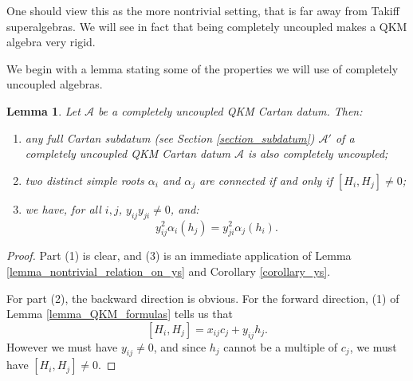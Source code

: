 \documentclass[12pt, a4paper, reqno]{amsart}
\def\AA{\mathcal{A}}
\newtheorem{lemma}{Lemma}
\theoremstyle{definition}
\theoremstyle{definition}
\theoremstyle{definition}
\numberwithin{theorem}{section}
\numberwithin{lemma}{section}
\numberwithin{remark}{section}
\numberwithin{definition}{section}
\numberwithin{corollary}{section}
\numberwithin{proposition}{section}
\numberwithin{example}{section}
\begin{document}
	One should view this as the more nontrivial setting, that is far away from Takiff superalgebras. We will see in fact that being completely uncoupled makes a QKM algebra very rigid.
	
	We begin with a lemma stating some of the properties we will use of completely uncoupled algebras.
	\begin{lemma}\label{lemma_uncoupled_facts}
		Let $\AA$ be a completely uncoupled QKM Cartan datum.  Then:
		\begin{enumerate}
			\item any full Cartan subdatum (see Section \ref{section_subdatum}) $\AA'$ of a completely uncoupled QKM Cartan datum $\AA$ is also completely uncoupled;
			\item two distinct simple roots $\alpha_i$ and $\alpha_j$  are connected if and only if $[H_i,H_j]\neq0$;
			\item we have, for all $i,j$, $y_{ij}y_{ji}\neq0$, and:
			\[
			y_{ij}^2\alpha_i(h_j)=y_{ji}^2\alpha_j(h_i).
			\]
		\end{enumerate} 
	\end{lemma}
	\begin{proof}
		Part (1) is clear, and (3) is an immediate application of Lemma \ref{lemma_nontrivial_relation_on_ys} and Corollary \ref{corollary_ys}.
		
		For part (2), the backward direction is obvious.  For the forward direction, (1) of Lemma \ref{lemma_QKM_formulas} tells us that 
		\[
		[H_i,H_j]=x_{ij}c_j+y_{ij}h_j.
		\]
		However we must have $y_{ij}\neq0$, and since $h_j$ cannot be a multiple of $c_j$, we must have $[H_i,H_j]\neq0$.
	\end{proof}
\end{document}
